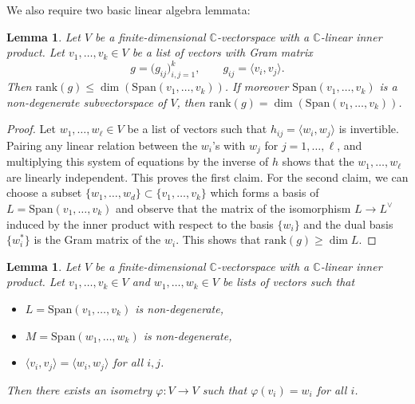 \documentclass[pdftex]{sigma}
\numberwithin{equation}{section}
\newtheorem{Lemma}[Theorem]{Lemma}
\newcommand{\BC}{{\mathbb{C}}}
\newcommand{\1}{\mathsf{1}}
\begin{document}
We also require two basic linear algebra lemmata:
\begin{Lemma} \label{lemma:la1}
Let $V$ be a finite-dimensional $\BC$-vectorspace with a $\BC$-linear inner product.
Let $v_1, \dots, v_k \in V$ be a list of vectors with Gram matrix
\[
g = \big( g_{ij} \big)_{i,j=1}^{k}, \qquad g_{ij} = \langle v_i, v_j \rangle.
 \]
Then $\mathrm{rank}(g) \leq \dim( \mathrm{Span}(v_1, \dots, v_k))$.
If moreover $\mathrm{Span}(v_1, \dots, v_k)$ is a non-degenerate subvectorspace of $V$, then
$\mathrm{rank}(g) = \dim( \mathrm{Span}(v_1, \dots, v_k))$.
\end{Lemma}
\begin{proof}
Let $w_1, \dots, w_{\ell} \in V$ be a list of vectors such that $h_{ij}=\langle w_i, w_j \rangle$ is invertible.
Pairing any linear relation between the $w_i$'s with $w_j$ for $j=1,\dots, \ell$,
and multiplying this system of equations by the inverse of $h$
shows that the $w_1, \dots, w_{\ell}$ are linearly independent.
This proves the first claim.
For the second claim, we can choose a subset $\{ w_1, \dots, w_d \} \subset \{ v_1, \dots, v_k \}$ which forms a basis of $L = \mathrm{Span}(v_1, \dots, v_k)$
and observe that the matrix of the isomorphism $L \to L^{\vee}$ induced by the inner product
with respect to the basis $\{ w_i \}$ and the dual basis $\{ w_i^{\ast} \}$
is the Gram matrix of the $w_i$.
This shows that $\mathrm{rank}(g) \geq \dim L$.
\end{proof}
\begin{Lemma} \label{lemma:a2}
Let $V$ be a finite-dimensional $\BC$-vectorspace with a $\BC$-linear inner product.
Let $v_1, \dots, v_k \in V$ and $w_1, \dots, w_k \in V$ be lists of vectors such that
\begin{itemize}\itemsep=0pt
\item[$(i)$] $L = \mathrm{Span}(v_1, \dots, v_k)$ is non-degenerate,
\item[$(ii)$] $M = \mathrm{Span}(w_1, \dots, w_k)$ is non-degenerate,
\item[$(iii)$] $\langle v_i, v_j \rangle = \langle w_i, w_j \rangle$ for all $i,j$.
\end{itemize}
Then there exists an isometry $\varphi \colon V \to V$ such that $\varphi(v_i) = w_i$ for all $i$.
\end{Lemma}
\end{document}
